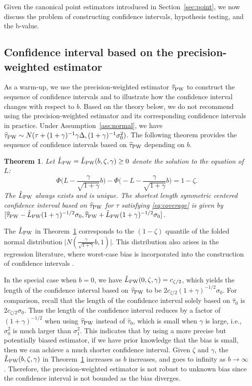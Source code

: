 \documentclass[11pt]{article}
\newcommand{\htau}{\widehat\tau}
\numberwithin{equation}{section}
\newtheorem{theorem}{Theorem}[section]
\theoremstyle{definition}
\begin{document}
Given the canonical point estimators introduced in Section~\ref{sec:point}, we now discuss the problem of constructing confidence intervals, hypothesis testing, and the b-value.

\subsection{Confidence interval based on the precision-weighted estimator}\label{sec:simple}

As a warm-up, we use the precision-weighted estimator $\htau_{\rm PW}$ to construct the sequence of confidence intervals and to illustrate how the confidence interval changes with respect to $b$. Based on the theory below, we do not recommend using the precision-weighted estimator and its corresponding confidence intervals in practice. Under Assumption~\ref{ass:normal}, we have $\htau_{\rm PW} \sim N(\tau +  (1+\gamma)^{-1} \gamma \Delta, (1+\gamma)^{-1} \sigma_0^2)$. The following theorem provides the sequence of confidence intervals based on $\htau_{\rm PW}$ depending on $b$.

\begin{theorem}\label{thm:L_PW}
  Let $\hat{L}_{\rm PW} = \hat{L}_{\rm PW}(b, \zeta, \gamma) \ge 0$ denote the solution to the equation of $L$:
  \[
    \Phi\Big(L - \frac{\gamma}{\sqrt{1+\gamma}} b \Big) - \Phi\Big(-L - \frac{\gamma}{\sqrt{1+\gamma}} b \Big) = 1-\zeta.
  \]
  The $\hat{L}_{\rm PW}$ always exists and is unique. The shortest length symmetric centered confidence interval based on $\htau_{\rm PW}$ for $\tau$ satisfying \eqref{eq:coverage} is given by $[\htau_{\rm PW} - \hat{L}_{\rm PW} (1+\gamma)^{-1/2} \sigma_0, \htau_{\rm PW} + \hat{L}_{\rm PW} (1+\gamma)^{-1/2} \sigma_0]$.
\end{theorem}

The $\hat{L}_{\rm PW}$ in Theorem~\ref{thm:L_PW} corresponds to the $(1-\zeta)$ quantile of the folded normal distribution $\lvert N(\frac{\gamma}{\sqrt{1+\gamma}} b, 1) \rvert$. This distribution also arises in the regression literature, where worst-case bias is incorporated into the construction of confidence intervals \citep{armstrong2020bias, armstrong2022robust}.

In the special case when $b=0$, we have $\hat{L}_{\rm PW}(0, \zeta, \gamma) = c_{\zeta/2}$, which yields the length of the confidence interval based on $\htau_{\rm PW}$ to be $2 c_{\zeta/2} (1+\gamma)^{-1/2} \sigma_0$. For comparison, recall that the length of the confidence interval solely based on $\htau_0$ is $2c_{\zeta/2} \sigma_0$. Thus the length of the confidence interval reduces by a factor of $(1+\gamma)^{-1/2}$ when using $\htau_{\rm PW}$ instead of $\htau_0$, which is small when $\gamma$ is large, i.e., $\sigma_0^2$ is much larger than $\sigma_1^2$. This indicates that by using a more precise but potentially biased estimator, if we have prior knowledge that the bias is small, then we can achieve a much shorter confidence interval. Given $\zeta$ and $\gamma$, the $\hat{L}_{\rm PW}(b, \zeta, \gamma)$ in Theorem~\ref{thm:L_PW} increases as $b$ increases, and goes to infinity as $b \to \infty$. Therefore, the precision-weighted estimator is not robust to unknown bias since the confidence interval is not bounded as the bias diverges.
\end{document}
